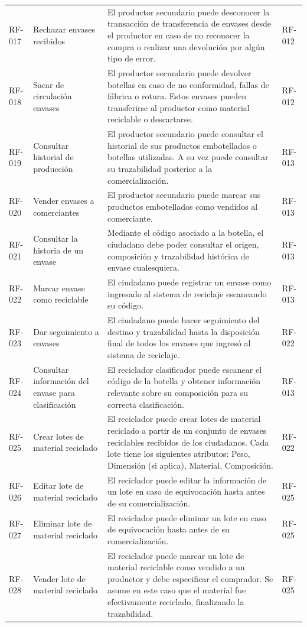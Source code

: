 \begin{xltabular}{\textwidth}{@{} L{1.5cm} L{2.5cm} Y L{1.5cm} @{}}
	RF-017 & Rechazar envases recibidos & El productor secundario puede desconocer la transacción de transferencia de envases desde el productor en caso de no reconocer la compra o realizar una devolución por algún tipo de error. & RF-012 \\
	RF-018 & Sacar de circulación envases & El productor secundario puede devolver botellas en caso de no conformidad, fallas de fábrica o rotura. Estos envases pueden transferirse al productor como material reciclable o descartarse. & RF-012 \\
	RF-019 & Consultar historial de producción & El productor secundario puede consultar el historial de sus productos embotellados o botellas utilizadas. A su vez puede consultar su trazabilidad posterior a la comercialización. & RF-013 \\
	RF-020 & Vender envases a comerciantes & El productor secundario puede marcar sus productos embotellados como vendidos al comerciante. & RF-013 \\
	RF-021 & Consultar la historia de un envase & Mediante el código asociado a la botella, el ciudadano debe poder consultar el origen, composición y trazabilidad histórica de envase cualesquiera. & RF-013 \\
	RF-022 & Marcar envase como reciclable & El ciudadano puede registrar un envase como ingresado al sistema de reciclaje escaneando su código. & RF-013 \\
	RF-023 & Dar seguimiento a envases & El ciudadano puede hacer seguimiento del destino y trazabilidad hasta la disposición final de todos los envases que ingresó al sistema de reciclaje. & RF-022 \\
	RF-024 & Consultar información del envase para clasificación & El reciclador clasificador puede escanear el código de la botella y obtener información relevante sobre su composición para su correcta clasificación. & RF-013 \\
	RF-025 & Crear lotes de material reciclado & El reciclador puede crear lotes de material reciclado a partir de un conjunto de envases reciclables recibidos de los ciudadanos. Cada lote tiene los siguientes atributos: Peso, Dimensión (si aplica), Material, Composición. & RF-022 \\
	RF-026 & Editar lote de material reciclado & El reciclador puede editar la información de un lote en caso de equivocación hasta antes de su comercialización. & RF-025 \\
	RF-027 & Eliminar lote de material reciclado & El reciclador puede eliminar un lote en caso de equivocación hasta antes de su comercialización. & RF-025 \\
	RF-028 & Vender lote de material reciclado & El reciclador puede marcar un lote de material reciclable como vendido a un productor y debe especificar el comprador. Se asume en este caso que el material fue efectivamente reciclado, finalizando la trazabilidad. & RF-025 \\
\end{xltabular}

